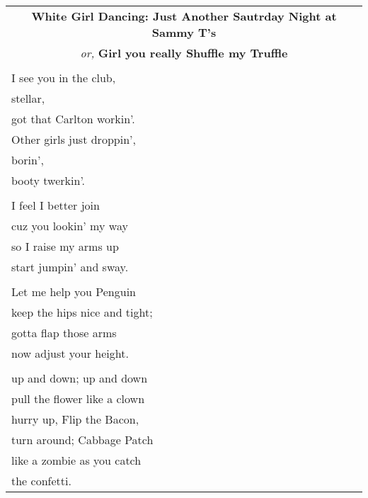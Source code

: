 \documentclass{article}
\begin{document}
\newcommand{\h}{\hspace{3ex}}
\newcommand{\hoar}{%
\begin{center}
\line(1,0){350}
\end{center}
}

\begin{center}
\begin{tabular}{l}
\multicolumn{1}{c}{\textbf{White Girl Dancing: Just Another Sautrday Night at Sammy T's}} \\
\multicolumn{1}{c}{\small\textit{or, }\textbf{Girl you really Shuffle my Truffle}} \\
\\
I see you in the club, \\
stellar, \\
got that Carlton workin'. \\
Other girls just droppin', \\
borin', \\
booty twerkin'. \\
\\
I feel I better join \\
cuz you lookin' my way \\
so I raise my arms up \\
start jumpin' and sway. \\
\\
Let me help you Penguin \\
keep the hips nice and tight; \\
gotta flap those arms \\
now adjust your height. \\
\\
up and down; up and down \\
pull the flower like a clown \\
hurry up, Flip the Bacon, \\
turn around; Cabbage Patch \\ 
like a zombie as you catch \\
the confetti. \\

\end{tabular}
\end{center}
\end{document}
